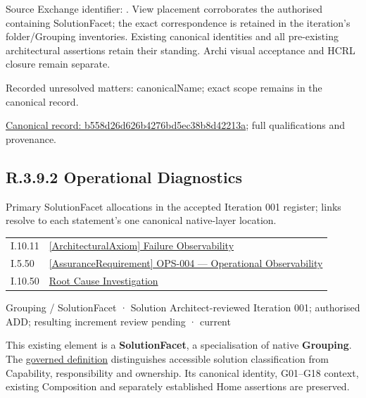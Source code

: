 Source Exchange identifier: \texttt{}. View placement corroborates
the authorised containing SolutionFacet; the exact correspondence is retained in the
iteration's folder/Grouping inventories. Existing canonical identities and all
pre-existing architectural assertions retain their standing. Archi visual
acceptance and HCRL closure remain separate.


{\small Recorded unresolved matters: canonicalName; exact scope remains in the canonical record.}\par
{\footnotesize \href{../../../../../../../continuum/grouping/b558d26d626b4276bd5ec38b8d42213a.md}{Canonical record: b558d26d626b4276bd5ec38b8d42213a}; full qualifications and provenance.}\par
\subsection*{R.3.9.2 Operational Diagnostics}
\label{navigation:R.3.9.2}

Primary SolutionFacet allocations in the accepted Iteration 001 register; links resolve to each statement’s one canonical native-layer location.\par
\begin{longtable}{p{.22\linewidth}p{.73\linewidth}}
I.10.11 & \hyperref[element:2ed20179a98d44a68880958155e47923]{[ArchitecturalAxiom] Failure Observability} \\
I.5.50 & \hyperref[element:b5d3447a05b249a8af154136fc36c4d9]{[AssuranceRequirement] OPS-004 — Operational Observability} \\
I.10.50 & \hyperref[element:9cdbf642158c4c37a6f3f10a6dd9ebfe]{Root Cause Investigation} \\
\end{longtable}
\label{element:45cb08d300b74853b456f333572a2bf6}
{\small Grouping / SolutionFacet · Solution Architect-reviewed Iteration 001; authorised ADD; resulting increment review pending · current}\par

This existing element is a \textbf{SolutionFacet}, a specialisation of native
\textbf{Grouping}. The \href{\detokenize{../../../../../../../governance/continuum-representation.md#solutionfacet-classification--1119-candidate}}{governed definition}
distinguishes accessible solution classification from Capability, responsibility
and ownership. Its canonical identity, G01–G18 context, existing Composition
and separately established Home assertions are preserved.



